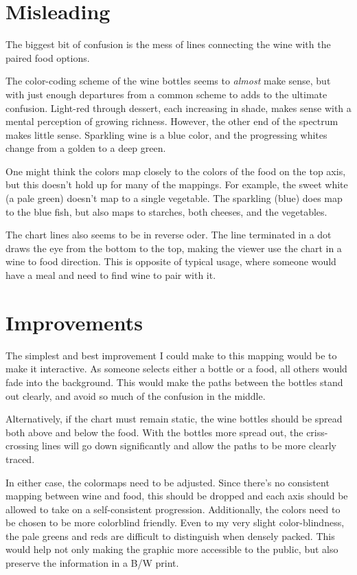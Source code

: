\documentclass[a4paper,11pt]{article}
\begin{document}
\section{Misleading}
The biggest bit of confusion is the mess of lines connecting the wine with the paired food options.  

The color-coding scheme of the wine bottles seems to {\it almost} make sense, but with just enough departures from a common scheme to adds to the ultimate confusion.  Light-red through dessert, each increasing in shade, makes sense with a mental perception of growing richness.  However, the other end of the spectrum makes little sense.  Sparkling wine is a blue color, and the progressing whites change from a golden to a deep green.  

One might think the colors map closely to the colors of the food on the top axis, but this doesn't hold up for many of the mappings.  For example, the sweet white (a pale green) doesn't map to a single vegetable.  The sparkling (blue) does map to the blue fish, but also maps to starches, both cheeses, and the vegetables.

The chart lines also seems to be in reverse oder.  The line terminated in a dot draws the eye from the bottom to the top, making the viewer use the chart in a wine to food direction.  This is opposite of typical usage, where someone would have a meal and need to find wine to pair with it.    

\section{Improvements}
The simplest and best improvement I could make to this mapping would be to make it interactive.  As someone selects either a bottle or a food, all others would fade into the background.  This would make the paths between the bottles stand out clearly, and avoid so much of the confusion in the middle.

Alternatively, if the chart must remain static, the wine bottles should be spread both above and below the food.  With the bottles more spread out, the criss-crossing lines will go down significantly and allow the paths to be more clearly traced.  

In either case, the colormaps need to be adjusted.  Since there's no consistent mapping between wine and food, this should be dropped and each axis should be allowed to take on a self-consistent progression.  Additionally, the colors need to be chosen to be more colorblind friendly.  Even to my very slight color-blindness, the pale greens and reds are difficult to distinguish when densely packed.  This would help not only making the graphic more accessible to the public, but also preserve the information in a B/W print.

\end{document}
